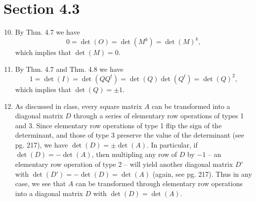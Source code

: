 \documentclass[12pt]{article}
\begin{document}
\section*{Section 4.3}

\begin{enumerate}
\setcounter{enumi}{9}
\item
By Thm. 4.7 we have
\begin{equation*}
0 = \det(O) = \det(M^k) = \det(M)^k,
\end{equation*}
which implies that $\det(M) = 0$.

\setcounter{enumi}{11}
\item
By Thm. 4.7 and Thm. 4.8 we have
\begin{equation*}
1 = \det(I) = \det(QQ^t) = \det(Q) \det(Q^t) = \det(Q)^2,
\end{equation*}
which implies that $\det(Q) = \pm 1$.

\setcounter{enumi}{20}
\item
As discussed in class, every square matrix $A$ can be transformed into a diagonal matrix $D$ through a series of elementary row operations of types 1 and 3. Since elementary row operations of type 1 flip the sign of the determinant, and those of type 3 preserve the value of the determinant (see pg. 217), we have $\det(D) = \pm \det(A)$. In particular, if $\det(D) = -\det(A)$, then multipling any row of $D$ by $-1$ -- an elementary row operation of type 2 -- will yield another diagonal matrix $D'$ with $\det(D') = -\det(D) = \det(A)$ (again, see pg. 217). Thus in any case, we see that $A$ can be transformed through elementary row operations into a diagonal matrix $D$ with $\det(D) = \det(A)$.


\end{enumerate}
\end{document}
